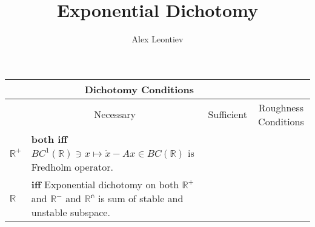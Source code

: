 \documentclass[12pt,fleqn]{article} %
\title{Exponential Dichotomy}
\author{Alex Leontiev}
\begin{document}
\maketitle
{}
\begin{center}
\newcommand{\mygraycenteredcell}[1]{\multicolumn{1}{c|}{\cellcolor{gray}#1}}
\newcommand{\mygraycenteredcello}{\cellcolor{gray}}

\begin{tabular}{ |l| p{} | p{} | p{}| }
\mygraycenteredcello&\multicolumn{2}{c|}{\cellcolor{gray}Dichotomy Conditions}&\mygraycenteredcello\\\hline
&\mygraycenteredcell{Necessary}&\mygraycenteredcell{Sufficient}&\mygraycenteredcell{Roughness Conditions}\\\hline\hline
$\mathbb{R}^+$&\textbf{both iff} $BC^1(\mathbb{R})\ni x\mapsto \dot{x}-Ax\in BC(\mathbb{R})$ is Fredholm operator.
& & \\\hline\hline
$\mathbb{R}$&\textbf{iff} Exponential dichotomy on both $\mathbb{R}^+$ and $\mathbb{R}^-$ and $\mathbb{R^n}$ is sum
of stable and unstable subspace.& & \\\hline
\end{tabular}
\end{center}
\end{document}
